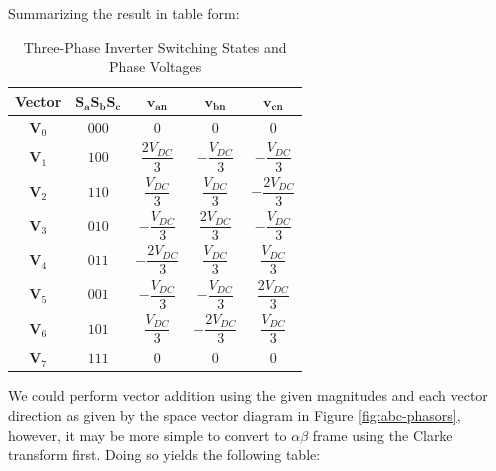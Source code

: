 \documentclass{article}
\begin{document}
Summarizing the result in table form:

\begin{table}[H]
    \centering
    \caption{Three-Phase Inverter Switching States and Phase Voltages}
    \label{tab:inverter_switching_states}

    \renewcommand{\arraystretch}{2.3}
    \setlength{\tabcolsep}{14pt}

    \begin{tabular}{c c c c c}
        \hline
        \textbf{Vector} &
        $\boldsymbol{S_aS_bS_c}$ &
        $\boldsymbol{v_{an}}$ &
        $\boldsymbol{v_{bn}}$ &
        $\boldsymbol{v_{cn}}$ \\
        \hline

        $\mathbf{V}_0$ & $000$
        & $0$ & $0$ & $0$ \\

        $\mathbf{V}_1$ & $100$
        & $\dfrac{2V_{DC}}{3}$
        & $-\dfrac{V_{DC}}{3}$
        & $-\dfrac{V_{DC}}{3}$ \\

        $\mathbf{V}_2$ & $110$
        & $\dfrac{V_{DC}}{3}$
        & $\dfrac{V_{DC}}{3}$
        & $-\dfrac{2V_{DC}}{3}$ \\

        $\mathbf{V}_3$ & $010$
        & $-\dfrac{V_{DC}}{3}$
        & $\dfrac{2V_{DC}}{3}$
        & $-\dfrac{V_{DC}}{3}$ \\

        $\mathbf{V}_4$ & $011$
        & $-\dfrac{2V_{DC}}{3}$
        & $\dfrac{V_{DC}}{3}$
        & $\dfrac{V_{DC}}{3}$ \\

        $\mathbf{V}_5$ & $001$
        & $-\dfrac{V_{DC}}{3}$
        & $-\dfrac{V_{DC}}{3}$
        & $\dfrac{2V_{DC}}{3}$ \\

        $\mathbf{V}_6$ & $101$
        & $\dfrac{V_{DC}}{3}$
        & $-\dfrac{2V_{DC}}{3}$
        & $\dfrac{V_{DC}}{3}$ \\

        $\mathbf{V}_7$ & $111$
        & $0$ & $0$ & $0$ \\

        \hline
    \end{tabular}
\end{table}

We could perform vector addition using the given magnitudes and each vector direction as given by the space vector diagram in Figure \ref{fig:abc-phasors}, however, it may be more simple to convert to $\alpha\beta$ frame using the Clarke transform first. Doing so yields the following table:
\end{document}
